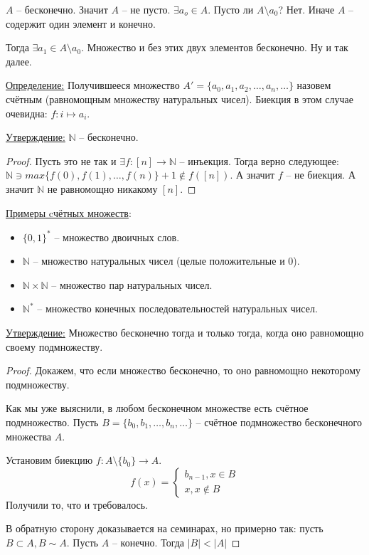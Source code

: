 \documentclass[a4paper, 12pt]{article}
\newcommand{\definition}{\underline{Определение:} }
\newcommand{\statement}{\underline{Утверждение:} }
\newcommand{\N}{\mathbb{N}}
\begin{document}
$A$ -- бесконечно. Значит $A$ -- не пусто. $\exists a_o \in A$. 
Пусто ли $A\setminus {a_0}$? Нет. Иначе $A$ -- содержит один элемент и конечно.

Тогда $\exists a_1 \in A\setminus {a_0}$. Множество и без этих двух элементов 
бесконечно. Ну и так далее.

\definition Получившееся множество $A' = \{a_0, a_1, a_2, \ldots, a_n, \ldots\}$ 
назовем счётным (равномощным множеству натуральных чисел).
Биекция в этом случае очевидна: $f: i \mapsto a_i$.

\statement $\N$ -- бесконечно.
\begin{proof}
    Пусть это не так и $\exists f: [n] \to \N$ -- инъекция. Тогда верно следующее:
    $\N \ni max\{f(0), f(1), \ldots, f(n)\}+1 \notin f([n])$. А значит $f$ -- не биекция.
    А значит $\N$ не равномощно никакому $[n]$.
\end{proof}

\underline{Примеры cчётных множеств}:

\begin{itemize}
        \item $\{ 0, 1\}^*$ -- множество двоичных слов.
        \item $\N$ -- множество натуральных чисел (целые положительные и 0).
        \item $\N \times \N$ -- множество пар натуральных чисел.
        \item $\N^*$ -- множество конечных последовательностей натуральных чисел.
\end{itemize}

\statement Множество бесконечно тогда и только тогда, когда оно равномощно 
своему подмножеству.
\begin{proof}
    Докажем, что если множество бесконечно, то оно равномощно некоторому подмножеству.

    Как мы уже выяснили, в любом бесконечном множестве есть счётное подмножество.
    Пусть $B = \{b_0, b_1, \ldots, b_n, \ldots\}$ -- счётное подмножество
    бесконечного множества $A$.

    Установим биекцию $f: A \setminus \{b_0\} \to A$.
    \[
    f(x) = \begin{cases}
        b_{n-1}, x \in B \\
        x, x \notin B
    \end{cases}
    \]
    Получили то, что и требовалось.

    В обратную сторону доказывается на семинарах, но примерно так:
    пусть $B \subset A, B \sim A$. Пусть $A$ -- конечно. Тогда $|B| < |A|$
\end{proof}
\end{document}
